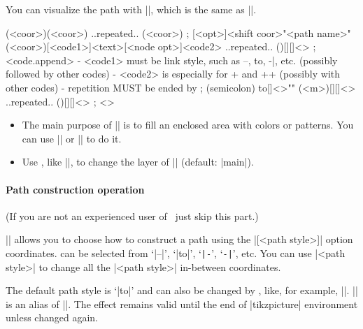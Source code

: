 You can visualize the path with |\tzpath[draw]|, which is the same as |\tzlinks|.


\begin{tzdef}
\tzpath (<coor>)(<coor>) ..repeated.. (<coor>) ;
[<opt>]<shift coor>"<path name>"
        (<coor>)[<code1>]{<text>}[<node opt>]<code2>
        ..repeated.. ()[]{}[]<> ; <code.append>
  - <code1> must be link style, such as --, to, -|, etc.
           (possibly followed by other codes)
  - <code2> is especially for + and ++
           (possibly with other codes)
  - repetition MUST be ended by ; (semicolon)
  {to}[]<>"" (<m>)[]{}[]<> ..repeated.. ()[]{}[]<> ; <>
\end{tzdef}

\remark
\begin{itemize}
\item The main purpose of |\tzpath| is to fill an enclosed area with colors or patterns.
You can use |\tzpath[fill]| or |\tzpath[pattern=<...>]| to do it.
\item Use \icmd{\settzpathlayer}, like ||, to change the layer of |\tzpath| (default: |main|).
\end{itemize}

\paragraph{Path construction operation}
(If you are not an experienced user of \Tikz\, just skip this part.)

|\tzpath| allows you to choose how to construct a path using the |[<path style>]| option  coordinates.  can be selected from `|--|', `|to|', `\verb+|-+', `\verb+-|+', etc.
You can use  |{<path style>}| to change all the |<path style>| in-between coordinates.


\begin{tzcode}{.3}
\end{tzcode}

The default path style is `|to|' and can also be changed by \icmd{\settzpathstyle}, like, for example, |\settzpathstyle{--}|. |\settzpathstyle| is an alias of |\settzlinkstyle|. The effect remains valid until the end of |tikzpicture| environment unless changed again.

